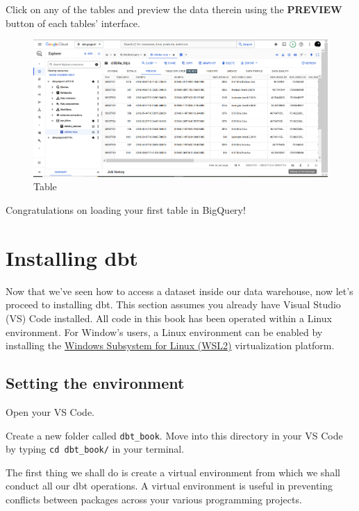 \documentclass[
]{book}
\begin{document}
Click on any of the tables and preview the data therein using the \textbf{PREVIEW} button of each tables' interface.

\begin{figure}
\centering
\includegraphics{./images/table_interface.png}
\caption{Table}
\end{figure}

Congratulations on loading your first table in BigQuery!

\hypertarget{installing-dbt}{%
\chapter{Installing dbt}\label{installing-dbt}}

Now that we've seen how to access a dataset inside our data warehouse, now let's proceed to installing dbt. This section assumes you already have Visual Studio (VS) Code installed. All code in this book has been operated within a Linux environment. For Window's users, a Linux environment can be enabled by installing the \href{https://www.freecodecamp.org/news/how-to-install-wsl2-windows-subsystem-for-linux-2-on-windows-10/}{Windows Subsystem for Linux (WSL2)} virtualization platform.

\hypertarget{setting-the-environment}{%
\section{Setting the environment}\label{setting-the-environment}}

Open your VS Code.

Create a new folder called \texttt{dbt\_book}. Move into this directory in your VS Code by typing \texttt{cd\ dbt\_book/} in your terminal.

The first thing we shall do is create a virtual environment from which we shall conduct all our dbt operations. A virtual environment is useful in preventing conflicts between packages across your various programming projects.
\end{document}
